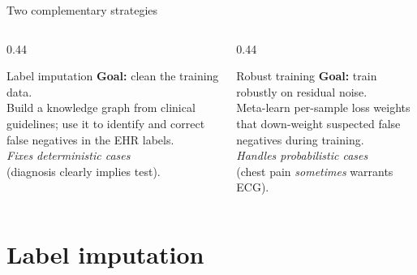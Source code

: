 \documentclass[aspectratio=169]{beamer}
\begin{document}
\begin{frame}{Two complementary strategies}
  \centering
  \vspace{0.5em}
  \begin{columns}[c]
    \begin{column}{0.44\textwidth}
      \begin{block}{\centering Label imputation}
        \small
        \textbf{Goal:} clean the training data.\\[0.3em]
        Build a knowledge graph from clinical guidelines;
        use it to identify and correct false negatives
        in the EHR labels.\\[0.3em]
        \textit{Fixes deterministic cases}\\
        (diagnosis clearly implies test).
      \end{block}
    \end{column}
    \begin{column}{0.44\textwidth}
      \begin{block}{\centering Robust training}
        \small
        \textbf{Goal:} train robustly on residual noise.\\[0.3em]
        Meta-learn per-sample loss weights that
        down-weight suspected false negatives
        during training.\\[0.3em]
        \textit{Handles probabilistic cases}\\
        (chest pain \emph{sometimes} warrants ECG).
      \end{block}
    \end{column}
  \end{columns}
\end{frame}

\section{Label imputation}
\end{document}
